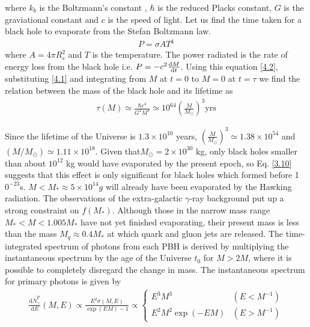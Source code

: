 where $k_{b}$ is the Boltzmann's constant , $\hbar$ is the reduced Placks constant, $G$ is the graviational constant and $c$ is the speed of light. Let us find the time taken for a black hole to evaporate from the Stefan Boltzmann law.
\begin{align}
    P = \sigma A T^4 \label{4.2}
\end{align}
where $A = 4 \pi R_{s}^2$ and $T$ is the temperature. The power radiated is the rate of energy loss from the black hole i.e. $P = -c^2 \dv{M}{t}$. Using this equation \ref{4.2}, substituting \ref{4.1} and integrating from $M$ at $t=0$ to $M=0$ at $t = \tau$  we find the relation between the mass of the black hole and its lifetime as
\begin{align}
   \tau(M) \simeq \frac{\hbar c^4}{G^2 M^3} \simeq 10^{64} \left(\frac{M}{M_{\odot}}\right)^{3} \mathrm{yrs} \label{4.3}
\end{align}

Since the lifetime of the Universe is $1.3 \times 10^{10}$ years, $ (\frac{M}{M_{\odot}})^3   \simeq 1.38 \times  10^{54}$ and $(M/M_{\odot}) \simeq  1.11 \times 10^{18}$. Given that$M_{\odot} = 2 \times 10^{30}$ kg, only black holes smaller than about $10^{12}$ kg would have evaporated by the present epoch, so Eq. \ref{3.10} suggests that this effect is only significant for black holes which formed before 1$0^{-23}$s. $M < M_{*} \approx 5\times 10^{14}g $ will already have been evaporated  by the Hawking radiation. The observations of the extra-galactic $\gamma$-ray background put up a strong constraint on $f(M_{*})$. Although those in the narrow mass range $M_{*} < M < 1.005 M_{*}$ have not yet finished evaporating, their present mass is less than the mass $M_q \approx 0.4 M_{*}$ at which quark and gluon jets are released. The time-integrated spectrum of photons from each PBH is derived by multiplying the instantaneous spectrum by the age of the Universe $t_0$ for $M > 2 M$, where it is possible to completely disregard the change in mass. The instantaneous spectrum for primary photons is given by
\begin{align}
    \frac{\mathrm{d} \dot{N}_\gamma^{\mathrm{P}}}{\mathrm{d} E}(M, E) \propto \frac{E^2 \sigma(M, E)}{\exp (E M)-1} \propto \begin{cases}E^3 M^3 & \left(E<M^{-1}\right) \\ E^2 M^2 \exp (-E M) & \left(E>M^{-1}\right)\end{cases} \label{4.4}
\end{align}


